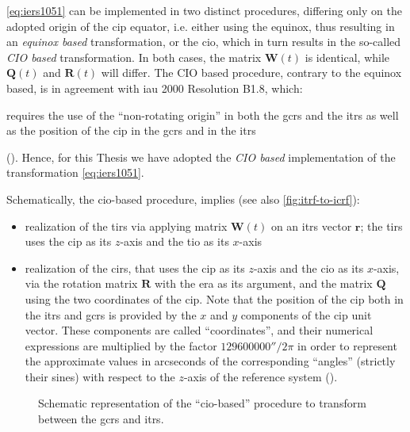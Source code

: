 \autoref{eq:iers1051} can be implemented in two distinct procedures, differing only on the 
adopted origin of the \gls{cip} equator, i.e. either using the equinox, thus resulting 
in an \emph{equinox based} transformation, or the \gls{cio}, which in turn results in 
the so-called \emph{CIO based} transformation. In both cases, the matrix $\bm{W}(t)$ is 
identical, while $\bm{Q}(t)$ and $\bm{R}(t)$ will differ. The CIO based
procedure, contrary to the equinox based, is in agreement with \gls{iau} 2000 Resolution B1.8, 
which:
\begin{displayquote}
requires the use of the ``non-rotating origin'' in both the \gls{gcrs} and the 
\gls{itrs} as well as the position of the \gls{cip} in the \gls{gcrs} and in the 
\gls{itrs} 
\end{displayquote}
(\cite{iers2010}). Hence, for this Thesis we have adopted the \emph{CIO based} 
implementation of the transformation \autoref{eq:iers1051}.

Schematically, the \gls{cio}-based procedure, implies (see also \autoref{fig:itrf-to-icrf}):
\begin{itemize}
    \item realization of the \gls{tirs} via applying matrix $\bm{W}(t)$ on an \gls{itrs} 
        vector $\bm{r}$; the \gls{tirs} uses the \gls{cip} as its $z$-axis and the 
        \gls{tio} as its $x$-axis
    \item realization of the \gls{cirs}, that uses the \gls{cip} as its $z$-axis and the 
        \gls{cio} as its $x$-axis, via the rotation matrix $\bm{R}$ with the \gls{era} 
        as its argument, and the matrix $\bm{Q}$ using the two coordinates of the \gls{cip}.
        Note that the position of the \gls{cip} both in the \gls{itrs} and \gls{gcrs} is 
        provided by the $x$ and $y$ components of the \gls{cip} unit vector.
        These components are called ``coordinates'', and their numerical expressions 
        are multiplied by the factor $\ang{;;129600000}/2 \pi$ in order to represent the 
        approximate values in arcseconds of the corresponding ``angles'' (strictly 
        their sines) with respect to the $z$-axis of the reference system (\cite{iers2010}).
\end{itemize}

\begin{figure}
  \centering
  
  \caption{Schematic representation of the ``\gls{cio}-based'' procedure to 
    transform between the \gls{gcrs} and \gls{itrs}.}
  \label{fig:itrf-to-icrf}
\end{figure}

